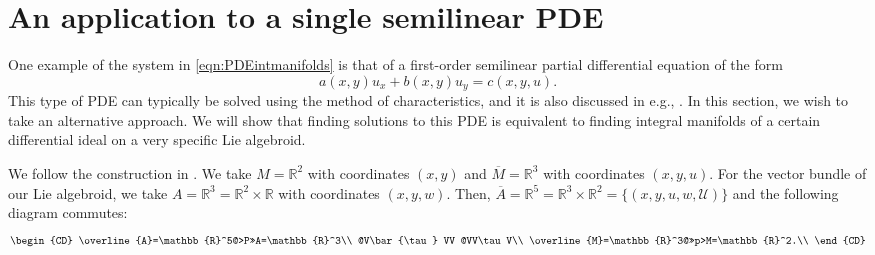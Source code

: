 \documentclass[11pt]{article}
\theoremstyle{plain}
\theoremstyle{definition}
\begin{document}


\section{An application to a single semilinear PDE}\label{sec:applications}


One example of the system in \eqref{eqn:PDEintmanifolds} is that of a first-order semilinear partial differential equation of the form
\begin{equation}\label{eqn:characteristics}
    a(x,y)u_x+b(x,y)u_y=c(x,y,u).
\end{equation}
This type of PDE can typically be solved using the method of characteristics, and it is also discussed in e.g., \cite{ivey2016cartan}. In this section, we wish to take an alternative approach. We will show that finding solutions to this PDE is equivalent to finding integral manifolds of a certain differential ideal on a very specific Lie algebroid.

We follow the construction in . We take $M=\mathbb{R}^2$ with coordinates $(x,y)$ and $\overline{M}=\mathbb{R}^3$ with coordinates $(x,y,u)$. For the vector bundle of our Lie algebroid, we take $A=\mathbb{R}^3=\mathbb{R}^2\times \mathbb{R}$ with coordinates $(x,y,w)$. Then, $\overline{A}=\mathbb{R}^5=\mathbb{R}^3\times \mathbb{R}^2=\{(x,y,u,w,{\mathcal U})\}$ and the following diagram commutes:
\begin{equation*}
\begin{CD}
\overline{A}=\mathbb{R}^5@>P>>A=\mathbb{R}^3\\
@V\bar{\tau} VV @VV\tau V\\
\overline{M}=\mathbb{R}^3@>>p>M=\mathbb{R}^2.\\
\end{CD}
\end{equation*}
\end{document}

